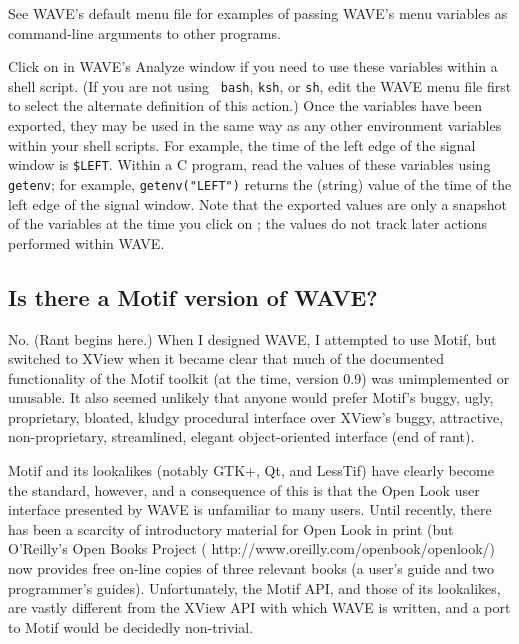 \documentclass[twoside]{book}
\newcommand{\button}[1]{\cornersize{2}\ovalbox{\rule[-.3mm]{0cm}{2.5mm}\small\sf ~#1~}}
\newcommand{\WAVE}{{\sf WAVE}\xspace}
\begin{document}
See \WAVE{}'s default menu file for examples of passing \WAVE{}'s menu
variables as command-line arguments to other programs.

Click on \button{Export variables} in \WAVE{}'s {\sf Analyze} window if you
need to use these variables within a shell script.  (If you are not using {\tt
bash}, {\tt ksh}, or {\tt sh}, edit the \WAVE{} menu file first to select the
alternate definition of this action.)  Once the variables have been exported,
they may be used in the same way as any other environment variables within your
shell scripts.  For example, the time of the left edge of the signal window is
{\tt \$LEFT}.  Within a C program, read the values of these variables using
{\tt getenv}; for example, {\tt getenv("LEFT")} returns the (string) value of
the time of the left edge of the signal window.  Note that the exported values
are only a snapshot of the variables at the time you click on \button{Export
variables}; the values do not track later actions performed within \WAVE{}.

\subsection{Is there a Motif version of \WAVE{}?}

No.  (Rant begins here.)  When I designed \WAVE{}, I attempted to use
Motif, but switched to XView when it became clear that much of the
documented functionality of the Motif toolkit (at the time, version
0.9) was unimplemented or unusable.  It also seemed unlikely that
anyone would prefer Motif's buggy, ugly, proprietary, bloated, kludgy
procedural interface over XView's buggy, attractive, non-proprietary,
streamlined, elegant object-oriented interface (end of rant).

Motif and its lookalikes (notably GTK+, Qt, and LessTif) have clearly become
the standard, however, and a consequence of this is that the Open Look user
interface presented by \WAVE{} is unfamiliar to many users.  Until recently,
there has been a scarcity of introductory material for Open Look in
print (but O'Reilly's Open Books Project
(
{http://www.oreilly.com/openbook/openlook/}) now provides free
on-line copies of three relevant books (a user's guide and two
programmer's guides).  Unfortunately, the
Motif API, and those of its lookalikes, are vastly different from the XView API
with which \WAVE{} is written, and a port to Motif would be decidedly
non-trivial.
\end{document}
